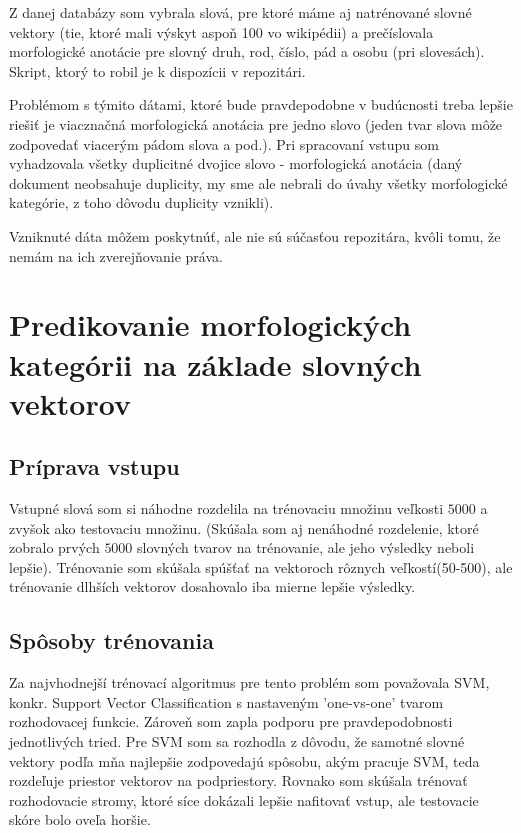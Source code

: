 \documentclass[12pt]{article}
\begin{document}
Z danej databázy som vybrala slová, pre ktoré máme aj natrénované slovné vektory (tie, ktoré mali výskyt aspoň 100 vo wikipédii) a prečíslovala morfologické anotácie pre slovný druh, rod, číslo, pád a osobu (pri slovesách). Skript, ktorý to robil je k dispozícii v repozitári.  

Problémom s týmito dátami, ktoré bude pravdepodobne v budúcnosti treba lepšie riešiť je viacznačná morfologická anotácia pre jedno slovo (jeden tvar slova môže zodpovedať viacerým pádom slova a pod.). Pri spracovaní vstupu som vyhadzovala všetky duplicitné dvojice slovo - morfologická anotácia (daný dokument neobsahuje duplicity, my sme ale nebrali do úvahy všetky morfologické kategórie, z toho dôvodu duplicity vznikli). 

Vzniknuté dáta môžem poskytnúť, ale nie sú súčasťou repozitára, kvôli tomu, že nemám na ich zverejňovanie práva. 

\section{Predikovanie morfologických kategórii na základe slovných vektorov}
\subsection{Príprava vstupu}
Vstupné slová som si náhodne rozdelila na trénovaciu množinu veľkosti $5000$ a zvyšok ako testovaciu množinu. (Skúšala som aj nenáhodné rozdelenie, ktoré zobralo prvých $5000$ slovných tvarov na trénovanie, ale jeho výsledky neboli lepšie). Trénovanie som skúšala spúšťať na vektoroch rôznych veľkostí(50-500), ale trénovanie dlhších vektorov dosahovalo iba mierne lepšie výsledky. 

\subsection{Spôsoby trénovania}
Za najvhodnejší trénovací algoritmus pre tento problém som považovala SVM, konkr. Support Vector Classification s nastaveným 'one-vs-one' tvarom rozhodovacej funkcie. Zároveň som zapla podporu pre pravdepodobnosti jednotlivých tried. Pre SVM som sa rozhodla z dôvodu, že samotné slovné vektory podľa mňa najlepšie zodpovedajú spôsobu, akým pracuje SVM, teda rozdeľuje priestor vektorov na podpriestory. Rovnako som skúšala trénovať rozhodovacie stromy, ktoré síce dokázali lepšie nafitovať vstup, ale testovacie skóre bolo oveľa horšie. 
\end{document}
